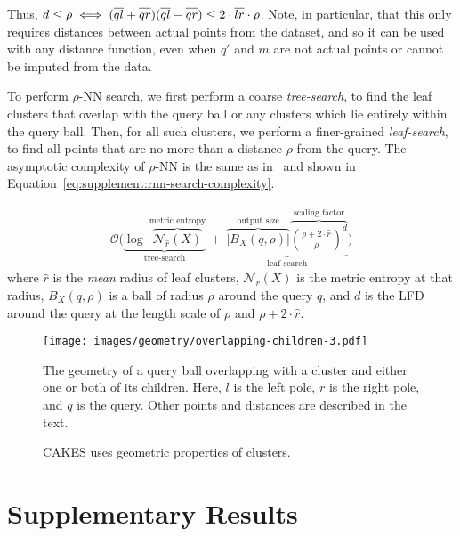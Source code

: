 \documentclass{article}
\begin{document}
Thus, $d \leq \rho \iff (\overline{q l} + \overline{q r \vphantom{l}})(\overline{q l} - \overline{q r \vphantom{l}}) \leq 2 \cdot \overline{l r} \cdot \rho$. Note, in particular, that this only requires distances between actual points from the dataset, and so it can be used with any distance function, even when $q'$ and $m$ are not actual points or cannot be imputed from the data.

To perform $\rho$-NN search, we first perform a coarse \textit{tree-search}, to find the leaf clusters that overlap with the query ball or any clusters which lie entirely within the query ball.
Then, for all such clusters, we perform a finer-grained \textit{leaf-search}, to find all points that are no more than a distance $\rho$ from the query.
The asymptotic complexity of $\rho$-NN is the same as in~\cite{ishaq2019clustered} and shown in Equation~\ref{eq:supplement:rnn-search-complexity}.

\begin{gather}
    \mathcal{O}
    \Bigg(
        \underbrace{
            \log~\overbrace{\mathcal{N}_{\hat{r}}(X)}^{\textrm{metric entropy}}
        }_{\textrm{tree-search}}
        \ + \
        \underbrace{
            \overbrace{ \big| B_X(q, \rho) \big|}^{\textrm{output size}}
            \overbrace{ \left( \frac{\rho + 2 \cdot \hat{r}}{ \rho} \right) ^ d}^{\textrm{scaling factor}}
        }_{\textrm{leaf-search}}
    \Bigg)
    \label{eq:supplement:rnn-search-complexity}
\end{gather}
where $\hat{r}$ is the \textit{mean} radius of leaf clusters, $\mathcal{N}_{\hat{r}}(X)$ is the metric entropy at that radius, $B_X(q, \rho)$ is a ball of radius $\rho$ around the query $q$, and $d$ is the LFD around the query at the length scale of $\rho$ and $\rho + 2 \cdot \hat{r}$.


\begin{figure}
    \centering
    \texttt{[image: images/geometry/overlapping-children-3.pdf]}
    \caption{The geometry of a query ball overlapping with a cluster and either one or both of its children. Here, $l$ is the left pole, $r$ is the right pole, and $q$ is the query. Other points and distances are described in the text.}
    \label{fig:supplement:overlapping-children}
    \caption{CAKES uses geometric properties of clusters.}
\end{figure}


\section{Supplementary Results}
\end{document}
